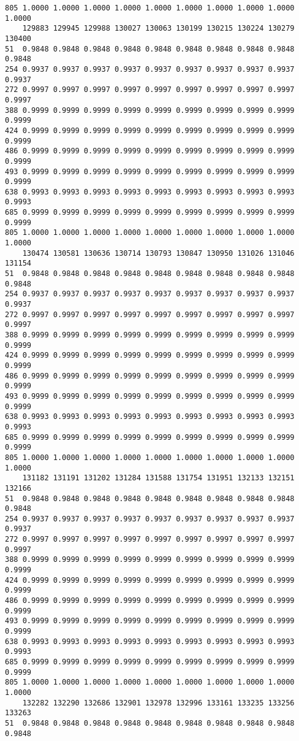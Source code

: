 \documentclass[
]{report}
\begin{document}
\begin{verbatim}
805 1.0000 1.0000 1.0000 1.0000 1.0000 1.0000 1.0000 1.0000 1.0000 1.0000
    129883 129945 129988 130027 130063 130199 130215 130224 130279 130400
51  0.9848 0.9848 0.9848 0.9848 0.9848 0.9848 0.9848 0.9848 0.9848 0.9848
254 0.9937 0.9937 0.9937 0.9937 0.9937 0.9937 0.9937 0.9937 0.9937 0.9937
272 0.9997 0.9997 0.9997 0.9997 0.9997 0.9997 0.9997 0.9997 0.9997 0.9997
388 0.9999 0.9999 0.9999 0.9999 0.9999 0.9999 0.9999 0.9999 0.9999 0.9999
424 0.9999 0.9999 0.9999 0.9999 0.9999 0.9999 0.9999 0.9999 0.9999 0.9999
486 0.9999 0.9999 0.9999 0.9999 0.9999 0.9999 0.9999 0.9999 0.9999 0.9999
493 0.9999 0.9999 0.9999 0.9999 0.9999 0.9999 0.9999 0.9999 0.9999 0.9999
638 0.9993 0.9993 0.9993 0.9993 0.9993 0.9993 0.9993 0.9993 0.9993 0.9993
685 0.9999 0.9999 0.9999 0.9999 0.9999 0.9999 0.9999 0.9999 0.9999 0.9999
805 1.0000 1.0000 1.0000 1.0000 1.0000 1.0000 1.0000 1.0000 1.0000 1.0000
    130474 130581 130636 130714 130793 130847 130950 131026 131046 131154
51  0.9848 0.9848 0.9848 0.9848 0.9848 0.9848 0.9848 0.9848 0.9848 0.9848
254 0.9937 0.9937 0.9937 0.9937 0.9937 0.9937 0.9937 0.9937 0.9937 0.9937
272 0.9997 0.9997 0.9997 0.9997 0.9997 0.9997 0.9997 0.9997 0.9997 0.9997
388 0.9999 0.9999 0.9999 0.9999 0.9999 0.9999 0.9999 0.9999 0.9999 0.9999
424 0.9999 0.9999 0.9999 0.9999 0.9999 0.9999 0.9999 0.9999 0.9999 0.9999
486 0.9999 0.9999 0.9999 0.9999 0.9999 0.9999 0.9999 0.9999 0.9999 0.9999
493 0.9999 0.9999 0.9999 0.9999 0.9999 0.9999 0.9999 0.9999 0.9999 0.9999
638 0.9993 0.9993 0.9993 0.9993 0.9993 0.9993 0.9993 0.9993 0.9993 0.9993
685 0.9999 0.9999 0.9999 0.9999 0.9999 0.9999 0.9999 0.9999 0.9999 0.9999
805 1.0000 1.0000 1.0000 1.0000 1.0000 1.0000 1.0000 1.0000 1.0000 1.0000
    131182 131191 131202 131284 131588 131754 131951 132133 132151 132166
51  0.9848 0.9848 0.9848 0.9848 0.9848 0.9848 0.9848 0.9848 0.9848 0.9848
254 0.9937 0.9937 0.9937 0.9937 0.9937 0.9937 0.9937 0.9937 0.9937 0.9937
272 0.9997 0.9997 0.9997 0.9997 0.9997 0.9997 0.9997 0.9997 0.9997 0.9997
388 0.9999 0.9999 0.9999 0.9999 0.9999 0.9999 0.9999 0.9999 0.9999 0.9999
424 0.9999 0.9999 0.9999 0.9999 0.9999 0.9999 0.9999 0.9999 0.9999 0.9999
486 0.9999 0.9999 0.9999 0.9999 0.9999 0.9999 0.9999 0.9999 0.9999 0.9999
493 0.9999 0.9999 0.9999 0.9999 0.9999 0.9999 0.9999 0.9999 0.9999 0.9999
638 0.9993 0.9993 0.9993 0.9993 0.9993 0.9993 0.9993 0.9993 0.9993 0.9993
685 0.9999 0.9999 0.9999 0.9999 0.9999 0.9999 0.9999 0.9999 0.9999 0.9999
805 1.0000 1.0000 1.0000 1.0000 1.0000 1.0000 1.0000 1.0000 1.0000 1.0000
    132282 132290 132686 132901 132978 132996 133161 133235 133256 133263
51  0.9848 0.9848 0.9848 0.9848 0.9848 0.9848 0.9848 0.9848 0.9848 0.9848

\end{verbatim}
\end{document}
